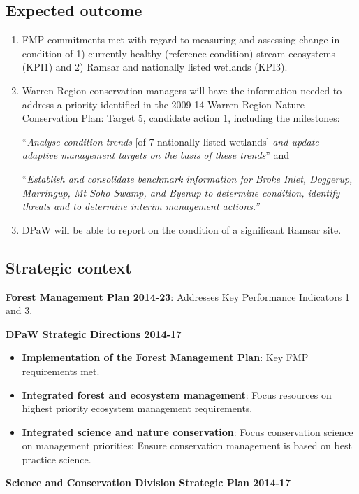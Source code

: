 \documentclass[version=last, paper=a4, DIV=18, usenames, dvipsnames]{scrartcl}
\begin{document}
\subsection*{Expected outcome}
\begin{enumerate}
\item
  FMP commitments met with regard to measuring and assessing change in
  condition of 1) currently healthy (reference condition) stream
  ecosystems (KPI1) and 2) Ramsar and nationally listed wetlands (KPI3).
\item
  Warren Region conservation managers will have the information needed
  to address a priority identified in the 2009-14 Warren Region Nature
  Conservation Plan: Target 5, candidate action 1, including the
  milestones:

  ``\emph{Analyse condition trends} {[}of 7 nationally listed
  wetlands{]} \emph{and update adaptive management targets on the basis
  of these trends}'' and

  ``\emph{Establish and consolidate benchmark information for Broke
  Inlet, Doggerup, Marringup, Mt Soho Swamp, and Byenup to determine
  condition, identify threats and to determine interim management
  actions.''}
\item
  DPaW will be able to report on the condition of a significant Ramsar
  site.
\end{enumerate}



\subsection*{Strategic context}
\textbf{Forest Management Plan 2014-23}: Addresses Key Performance
Indicators 1 and 3.

\textbf{DPaW Strategic Directions 2014-17}

\begin{itemize}
\item
  \textbf{Implementation of the Forest Management Plan}: Key FMP
  requirements met.
\item
  \textbf{Integrated forest and ecosystem management}: Focus resources
  on highest priority ecosystem management requirements.
\item
  \textbf{Integrated science and nature conservation}: Focus
  conservation science on management priorities: Ensure conservation
  management is based on best practice science.
\end{itemize}

\textbf{Science and Conservation Division Strategic Plan 2014-17}
\end{document}
